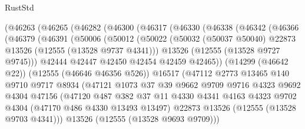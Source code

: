 \begin{lexlean}{RustStd}
\begin{coremodule}
        (@46263
          (@46265
            (@46282
              (@46300
                (@46317
                  (@46330
                    (@46338
                      (@46342
                        (@46366
                          (@46379
                            (@46391
                              (@50006
                                (@50012
                                  (@50022
                                    (@50032
                                      (@50037 @50040)
                                      @22873
                                      @13526
                                      (@12555 (@13528 @9737 @4341)))
                                    @13526
                                    (@12555 (@13528 @9727 @9745)))
                                  @42444
                                  @42447
                                  @42450
                                  @42454
                                  @42459
                                  @42465))
                              (@14299 (@46642 @22))
                              (@12555 (@46646 @46356 @526))
                              @16517
                              (@47112
                                @2773
                                @13465
                                @140
                                @9710
                                @9717
                                @8934
                                (@47121
                                  @1073
                                  @37
                                  @39
                                  @9662
                                  @9709
                                  @9716
                                  @4323
                                  @9692
                                  @4304
                                  @47156
                                  (@47120
                                    @487
                                    @382
                                    @37
                                    @11
                                    @4330
                                    @4341
                                    @4163
                                    @4323
                                    @9702
                                    @4304
                                    (@47170 @486 @4330 @13493 @13497)
                                    @22873
                                    @13526
                                    (@12555 (@13528 @9703 @4341)))
                                  @13526
                                  (@12555 (@13528 @9693 @9709)))

\end{coremodule}
\end{lexlean}
